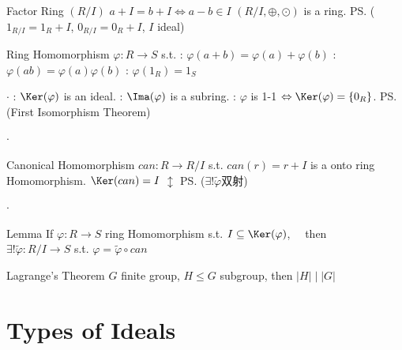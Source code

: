 \documentclass{note}
\begin{document}
\begin{MyTh}{Factor Ring $(R/I)$}
    $a+I=b+I \Leftrightarrow a-b\in I$ \quad $(R/I,\oplus,\odot)$ is a ring. \ps{($1_{R/I}=1_R+I$, $0_{R/I}=0_R+I$, $I$ ideal)} \qquad {}
\end{MyTh}

\begin{MyTh}{Ring Homomorphism}
    $\varphi:R\to S$ s.t. : $\varphi(a+b)=\varphi(a)+\varphi(b)$ \quad {}: $\varphi(ab)=\varphi(a)\varphi(b)$ \quad {}: $\varphi(1_R)=1_S$

    \quad $\cdot$ : $\Ker(\varphi)$ is an ideal. \quad {}: $\Ima(\varphi)$ is a subring. \quad {}: $\varphi$ is 1-1 $\Leftrightarrow \Ker(\varphi)=\{0_R\}$. \quad {} \ps{(First Isomorphism Theorem)}

    \quad $\cdot$ \begin{MyTh}{Canonical Homomorphism}
        $can:R\to R/I$ s.t. $can(r)=r+I$ is a onto ring Homomorphism. \quad $\Ker(can)=I$ \qquad $\updownarrow$ \ps{($\exists!\tilde{\varphi}$双射)}
    \end{MyTh}

    \quad $\cdot$ \begin{MyTh}{Lemma}
            If $\varphi:R\to S$ ring Homomorphism s.t. $I\subseteq \Ker(\varphi)$, \ \ then \ \ $\exists! \tilde{\varphi}:R/I\to S$ s.t. $\varphi=\tilde{\varphi}\circ can$ \ \ 
    \end{MyTh}
\end{MyTh}


\begin{MyTh}{Lagrange's Theorem}
    $G$ finite group, $H\le G$ subgroup, then $|H| \mid |G|$
\end{MyTh}


\section{Types of Ideals}
\vspace{-13pt}\hspace{90pt} 
\end{document}
